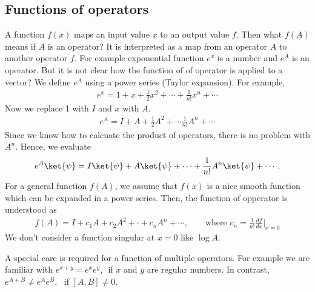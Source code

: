 \documentclass[letterpaper,10pt,english]{jupyterBook}
\begin{document}
\subsection{Functions of operators}
\label{\detokenize{qmsummary/operators:functions-of-operators}}
\sphinxAtStartPar
A function \(f(x)\) maps an input value \(x\) to an output value \(f\).  Then what \(f(A)\) means if \(A\) is an operator? It is interpreted as a map from an operator \(A\) to another operator \(f\).  For example exponential function \(e^x\) is a number and \(e^A\) is an operator. But it is not clear how the function of of operator is applied to a vector?  We define \(e^A\) using a power series (Taylor expansion).  For example,
\begin{equation*}
\begin{split}
e^x = 1 + x + \frac{1}{2}x^2 + \cdots + \frac{1}{n!}x^n + \cdots
\end{split}
\end{equation*}
\sphinxAtStartPar
Now we replace 1 with \(I\) and \(x\) with \(A\).
\begin{equation*}
\begin{split}
e^A = I + A + \frac{1}{2} A^2 + \cdots \frac{1}{n!} A^n + \cdots
\end{split}
\end{equation*}
\sphinxAtStartPar
Since we know how to calcuate the product of operators, there is no problem with \(A^n\).  Hence, we evaluate
\begin{equation*}
\begin{split}
e^A \ket{\psi} = I \ket{\psi} + A \ket{\psi} + \cdots + \frac{1}{n!} A^n \ket{\psi} + \cdots.
\end{split}
\end{equation*}
\sphinxAtStartPar
For a general function \(f(A)\), we assume that \(f(x)\) is a nice smooth function which can be expanded in a power series.  Then, the function of opperator is understood as
\begin{equation*}
\begin{split}
f(A) = I + c_1 A + c_2 A^2 + \cdot + c_n A^n + \cdots, \qquad \text{where  } c_n = \frac{1}{n!} \frac{d f}{dx} \Big|_{x=0}
\end{split}
\end{equation*}
\sphinxAtStartPar
We don’t consider a function singular at \(x=0\) like \(\log{A}\).

\sphinxAtStartPar
A special care is required for a function of multiple operators.  For example we are familiar with  \(e^{x+y} = e^x e^y,\,\) if \(x\) and \(y\) are regular numbers.  In contrast,  \(e^{A+B} \ne e^A e^B,\,\,\) if \([A,B]\ne 0\).
\end{document}

